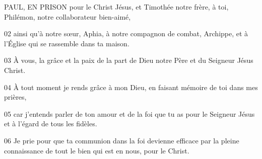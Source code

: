 PAUL, EN PRISON pour le Christ Jésus, et Timothée notre frère, à toi, Philémon, notre collaborateur bien-aimé,

02 ainsi qu’à notre sœur, Aphia, à notre compagnon de combat, Archippe, et à l’Église qui se rassemble dans ta maison.

03 À vous, la grâce et la paix de la part de Dieu notre Père et du Seigneur Jésus Christ.

04 À tout moment je rends grâce à mon Dieu, en faisant mémoire de toi dans mes prières,

05 car j’entends parler de ton amour et de la foi que tu as pour le Seigneur Jésus et à l’égard de tous les fidèles.

06 Je prie pour que ta communion dans la foi devienne efficace par la pleine connaissance de tout le bien qui est en nous, pour le Christ.
